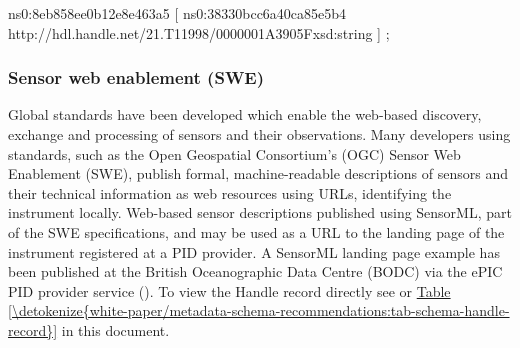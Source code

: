\documentclass[a4paper,10pt,english]{sphinxmanual}
\begin{document}
\begin{sphinxVerbatim}[commandchars=\\\{\}]
    ns0:8eb858ee0b12e8e463a5 [ ns0:38330bcc6a40ca85e5b4 \PYGZdq{}http://hdl.handle.net/21.T11998/0000\PYGZhy{}001A\PYGZhy{}3905\PYGZhy{}F\PYGZdq{}\PYGZca{}\PYGZca{}xsd:string ] ;
\end{sphinxVerbatim}


\subsubsection{Sensor web enablement (SWE)}
\label{\detokenize{white-paper/landing-page-encoding:sensor-web-enablement-swe}}\label{\detokenize{white-paper/landing-page-encoding:landing-page-encoding-swe}}
Global standards have been developed which enable the web-based
discovery, exchange and processing of sensors and their observations.
Many developers using standards, such as the Open Geospatial
Consortium’s (OGC) Sensor Web Enablement (SWE), publish formal,
machine-readable descriptions of sensors and their technical information
as web resources using URLs, identifying the instrument locally.
Web-based sensor descriptions published using SensorML, part of the SWE
specifications, and may be used as a URL to the landing page of the
instrument registered at a PID provider. A SensorML landing page example
has been published at the British Oceanographic Data Centre (BODC) via
the ePIC PID provider service
(). To view the Handle
record directly see
 or
\hyperref[\detokenize{white-paper/metadata-schema-recommendations:tab-schema-handle-record}]{Table \ref{\detokenize{white-paper/metadata-schema-recommendations:tab-schema-handle-record}}} in this document.
\end{document}
